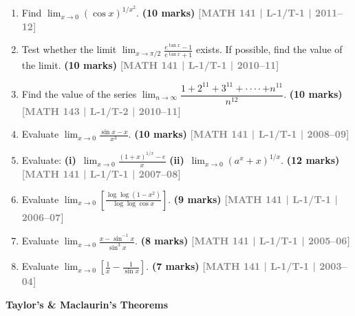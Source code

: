 \documentclass[12pt,a3paper]{article}
\newcommand{\yr}[1]{\hfill\textcolor{gray}{\small\textbf{[#1]}}}
\newcommand{\mk}[1]{\textcolor{orange!70!black}{\small\textbf{(#1 marks)}}}
\newcommand{\subtopic}[2]{%
  \vspace{10pt}
  \noindent\begin{tcolorbox}[colback=#1!8,colframe=#1,boxrule=0.6pt,arc=4pt,
    left=6pt,right=6pt,top=4pt,bottom=4pt]
    \small\bfseries\textcolor{#1}{#2}
  \end{tcolorbox}
  \vspace{2pt}
}
\begin{document}
\begin{enumerate}
\item Find $\displaystyle\lim_{x\to 0}(\cos x)^{1/x^{2}}$.
\mk{10} \yr{MATH 141 | L-1/T-1 | 2011--12}

\item Test whether the limit $\displaystyle\lim_{x\to\pi/2}\frac{e^{\tan x}-1}{e^{\tan x}+1}$ exists. If possible, find the value of the limit.
\mk{10} \yr{MATH 141 | L-1/T-1 | 2010--11}

\item Find the value of the series $\displaystyle\lim_{n\to\infty}\dfrac{1+2^{11}+3^{11}+\cdot\cdot\cdot\cdot+n^{11}}{n^{12}}$.
\mk{10} \yr{MATH 143 | L-1/T-2 | 2010--11}

\item Evaluate $\displaystyle\lim_{x\to 0}\frac{\sin x - x}{x^{3}}$.
\mk{10} \yr{MATH 141 | L-1/T-1 | 2008--09}

\item Evaluate: \textbf{(i)}~$\displaystyle\lim_{x\to 0}\frac{(1+x)^{1/x}-e}{x}$ \quad \textbf{(ii)}~$\displaystyle\lim_{x\to 0}(a^{x}+x)^{1/x}$.
\mk{12} \yr{MATH 141 | L-1/T-1 | 2007--08}

\item Evaluate $\displaystyle\lim_{x\to 0}\left[\frac{\log\log(1-x^{2})}{\log\log\cos x}\right]$.
\mk{9} \yr{MATH 141 | L-1/T-1 | 2006--07}

\item Evaluate $\displaystyle\lim_{x\to 0}\frac{x-\sin^{-1}x}{\sin^{3}x}$.
\mk{8} \yr{MATH 141 | L-1/T-1 | 2005--06}

\item Evaluate $\displaystyle\lim_{x\to 0}\left[\frac{1}{x}-\frac{1}{\sin x}\right]$.
\mk{7} \yr{MATH 141 | L-1/T-1 | 2003--04}

\end{enumerate}

\subtopic{cA}{Taylor's \& Maclaurin's Theorems}
\label{sub:s1-taylor}
\end{document}

